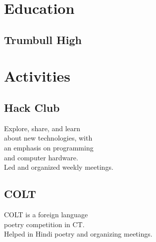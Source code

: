 \documentclass[]{resume-template}
\begin{document}
%
%
\lastupdated{}

%
%

%
%

\begin{minipage}[t]{0.33\textwidth} 


\section{Education}


\subsection{Trumbull High}
\sectionsep{}




\section{Activities}\label{sec:activities}

\subsection{Hack Club}
Explore, share, and learn\\ about
new technologies, with \\
an emphasis on programming\\
and computer hardware.\\ Led and organized weekly meetings.
\vspace{\topsep}
\subsection{COLT}
COLT is a foreign language\\ poetry competition in CT.\\ Helped in Hindi poetry and organizing meetings.
\sectionsep{}


\end{minipage}
\end{document}
